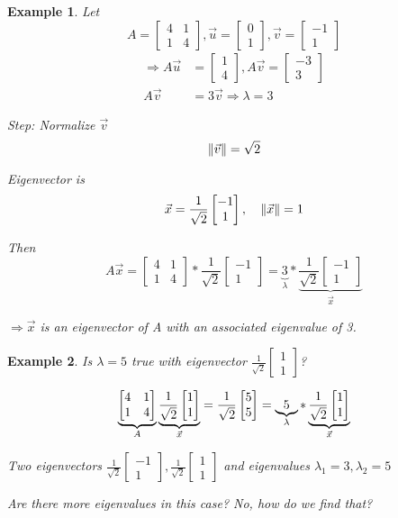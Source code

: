 \documentclass[12pt]{amsart}
\newtheorem{example}{Example}      %
\numberwithin{equation}{theorem}    %
\DeclarePairedDelimiter\norm{\lVert}{\rVert} %
\newcommand{\drawvec}[1]{                    %
    \begin{bmatrix}
        #1
    \end{bmatrix}
}
\begin{document}
\begin{example}
    Let \begin{equation*}
        A=\begin{bmatrix}
            4 & 1 \\
            1 & 4
        \end{bmatrix}, \vec{u}=\drawvec{0 \\ 1}, \vec{v}=\drawvec{-1 \\ 1}
    \end{equation*}
    \begin{align*}
        \Rightarrow A\vec{u} & = \drawvec{1                       \\ 4}, A\vec{v} = \drawvec{-3\\3} \\
        A\vec{v}             & = 3\vec{v} \Rightarrow \lambda = 3
    \end{align*}

    Step: Normalize $\vec{v}$
    $$\norm{\vec{v}} = \sqrt{2}$$

    Eigenvector is $$\vec{x} = \frac{1}{\sqrt{2}} \drawvec{-1\\1}, \quad \norm{\vec{x}} = 1$$

    Then
    $$A\vec{x} =
        \begin{bmatrix}
            4 & 1 \\
            1 & 4
        \end{bmatrix}
        * \frac{1}{\sqrt{2}}
        \drawvec{-1 \\ 1}
        =
        \underbrace{3}_\lambda *
        \underbrace{ \frac{1}{\sqrt2} \drawvec{-1\\1}}_{\vec{x}}
    $$

    $\Rightarrow \vec{x}$ is an \emph{eigenvector} of A with an associated \emph{eigenvalue} of 3.
\end{example}

\begin{example}
    
Is $\lambda=5$ true with eigenvector $\frac{1}{\sqrt{2}} \drawvec{1\\ 1}$?


\begin{equation*}
    \underbrace{ \drawvec{4 & 1\\ 1 & 4} }_A \underbrace{ \frac{1}{\sqrt{2}} \drawvec{1 \\ 1} }_{\vec{x}} = \frac{1}{\sqrt{2}} \drawvec{5 \\ 5} = \underbrace{5}_\lambda* \underbrace{\frac{1}{\sqrt{2}} \drawvec{1 \\ 1}}_{\vec{x}}
\end{equation*}

Two eigenvectors $\frac{1}{\sqrt{2}} \drawvec{-1 \\ 1}, \frac{1}{\sqrt{2}} \drawvec{1 \\ 1}$ and eigenvalues $\lambda_1 = 3, \lambda_2 = 5$

Are there more eigenvalues in this case? No, how do we find that?
\end{example}
\end{document}
